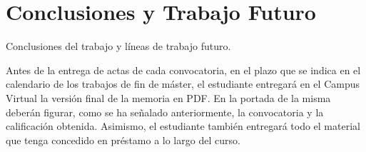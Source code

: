 \chapter{Conclusiones y Trabajo Futuro}
\label{cap:conclusiones}


Conclusiones del trabajo y líneas de trabajo futuro.

Antes de la entrega de actas de cada convocatoria, en el plazo que se indica en el calendario de los trabajos de fin de máster, el estudiante entregará en el Campus Virtual la versión final de la memoria en PDF. En la portada de la misma deberán figurar, como se ha señalado anteriormente, la convocatoria y la calificación obtenida. Asimismo, el estudiante también entregará todo el material que tenga concedido en préstamo a lo largo del curso.


